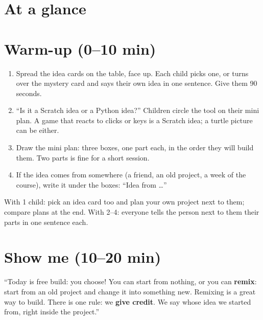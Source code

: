\section{At a glance}
\begin{timeplan}
\end{timeplan}

\section{Warm-up (0--10 min)}
\begin{unplugged}
\begin{enumerate}[leftmargin=1.4em,itemsep=1pt]
  \item Spread the idea cards on the table, face up. Each child picks one, or turns over the mystery card and says their own idea in one sentence. Give them 90 seconds.
  \item \enquote{Is it a Scratch idea or a Python idea?} Children circle the tool on their mini plan. A game that reacts to clicks or keys is a Scratch idea; a turtle picture can be either.
  \item Draw the mini plan: three boxes, one part each, in the order they will build them. Two parts is fine for a short session.
  \item If the idea comes from somewhere (a friend, an old project, a week of the course), write it under the boxes: \enquote{Idea from \ldots}
\end{enumerate}
With 1 child: pick an idea card too and plan your own project next to them; compare plans at the end. With 2--4: everyone tells the person next to them their parts in one sentence each.
\end{unplugged}

\section{Show me (10--20 min)}
\begin{teacherscript}
\enquote{Today is free build: you choose! You can start from nothing, or you can \textbf{remix}: start from an old project and change it into something new. Remixing is a great way to build. There is one rule: we \textbf{give credit}. We say whose idea we started from, right inside the project.}
\end{teacherscript}

